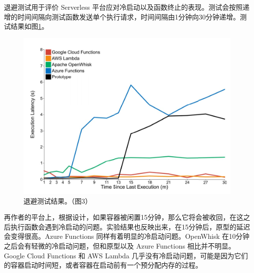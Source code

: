 \documentclass[11pt]{article}
\begin{document}
退避测试用于评价 Serverless 平台应对冷启动以及函数终止的表现。测试会按照递增的时间间隔向测试函数发送单个执行请求，时间间隔由1分钟向30分钟递增。测试结果如图\ref{figs:2017_backoff_test}。
\begin{figure}[!htbp]
	\centering
	\includegraphics[width=0.8\linewidth]{figs/2017_backoff_test}
	\caption{退避测试结果。（\cite{mcgrath2017serverless}图3）}
	\label{figs:2017_backoff_test}
\end{figure}


再作者的平台上，根据设计，如果容器被闲置15分钟，那么它将会被收回，在这之后执行函数会遇到冷启动的问题。实验结果也反映出来，在15分钟后，原型的延迟会变得很高。Azure Functions 同样有着明显的冷启动问题。OpenWhisk 在10分钟之后会有轻微的冷启动问题，但和原型以及 Azure Functions 相比并不明显。Google Cloud Functions 和 AWS Lambda 几乎没有冷启动问题，可能是因为它们的容器启动时间短，或者容器在启动前有一个预分配内存的过程。
\end{document}
